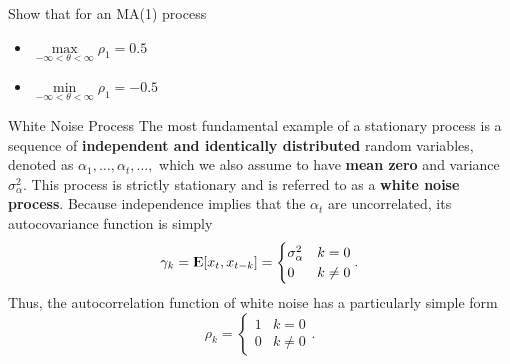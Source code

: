\documentclass[UTF8,a4paper,14pt]{ctexart}
\newcommand{\E}{{\rm I\kern-.3em E}}
\theoremstyle{definition}
\theoremstyle{remark}
\begin{document}
\begin{Problem}{}
    Show that for an MA(1) process
    \begin{itemize}
        \item \(\underset{-\infty<\theta<\infty}{\max}\rho_1 = 0.5\)
        \item \(\underset{-\infty<\theta<\infty}{\min}\rho_1 = -0.5\)
    \end{itemize}
    \end{Problem}
    \begin{mybox}{White Noise Process}
      The most fundamental example of a stationary process is a sequence of \textbf{independent and identically distributed} random variables, denoted as $\alpha_1, \ldots , \alpha_t, \ldots,$ which we also assume to have \textbf{mean zero} and variance $\sigma_\alpha^2$. This process is strictly stationary and is referred to as a \textbf{white noise process}. Because independence implies that the $\alpha_t$ are uncorrelated, its autocovariance function is simply
      \[\gamma_k = \E[x_t,x_{t-k}] = \begin{cases}
          \sigma_\alpha^2 & k = 0\\
          0               & k \neq0
      \end{cases}.\]
      Thus, the autocorrelation function of white noise has a particularly simple form  
      \[\rho_k = \begin{cases}
        1 & k = 0\\
        0 & k \neq0
    \end{cases}.\]   
  \end{mybox}
\end{document}
